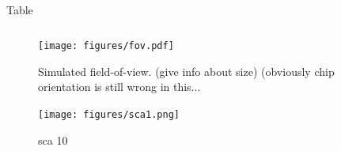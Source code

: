 \documentclass[aps,prd, amsmath,amssymb,superscriptaddress,showkeys,nofootinbib,reprint,preprintnumbers]{revtex4-1}
\begin{document}
\def\arraystretch{1.4}
\setlength{\tabcolsep}{4pt}
\begin{table}
\caption{Table}
\label{table:values}
\begin{center}
\begin{tabular}{lcccc }
\hline
\hline
\hline
\hline
\end{tabular}
\end{center}
\end{table}

\begin{figure}
\begin{center}
\texttt{[image: figures/fov.pdf]}
\end{center}
\caption[]{
Simulated field-of-view. (give info about size) (obviously chip orientation is still wrong in this...
\label{fig:fov}}
\end{figure}


\begin{figure}
\begin{center}
\texttt{[image: figures/sca1.png]}
\end{center}
\caption[]{
sca 10
\label{fig:sca}}
\end{figure}
\end{document}

